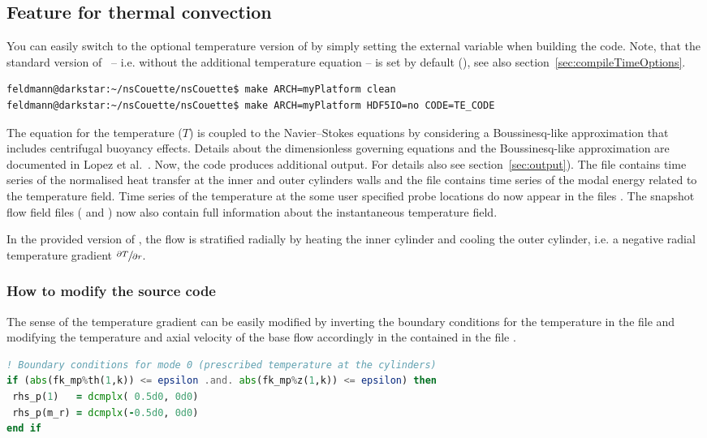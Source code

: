 \documentclass[a4paper, 11pt, DIV=11]{scrartcl}
\begin{document}
\subsection{Feature for thermal convection}
\label{sec:thermalConvection}

You can easily switch to the optional temperature version of \nsc by simply
setting the external variable  when building the code.
Note, that the standard version of \nsc~-- i.e. without the additional
temperature equation -- is set by default (), see also
section~\ref{sec:compileTimeOptions}.
\begin{lstlisting}[language=bash]
feldmann@darkstar:~/nsCouette/nsCouette$ make ARCH=myPlatform clean
feldmann@darkstar:~/nsCouette/nsCouette$ make ARCH=myPlatform HDF5IO=no CODE=TE_CODE
\end{lstlisting}
\par
The equation for the temperature ($T$) is coupled to the Navier--Stokes
equations by considering a Boussinesq-like approximation that includes
centrifugal buoyancy effects. Details about the dimensionless governing
equations and the Boussinesq-like approximation are documented in Lopez
et al.~\cite{Lopez2013}. Now, the code produces additional output. For
details also see section~\ref{sec:output}). The file 
contains time series of the normalised heat transfer at the inner and
outer cylinders walls and the file  contains time
series of the modal energy related to the temperature field. Time series
of the temperature at the some user specified probe locations do now
appear in the files . The snapshot flow field files
( and ) now also contain full information
about the instantaneous temperature field.
\par
In the provided version of \nsc, the flow is stratified radially by
heating the inner cylinder and cooling the outer cylinder, i.e. a
negative radial temperature gradient $\sfrac{\partial T}{\partial r}$.

\subsubsection{How to modify the source code}

The sense of the temperature gradient can be easily modified by inverting
the boundary conditions for the temperature in the file 
and modifying the temperature and axial velocity of the base flow accordingly
in the  contained in the file .
\begin{lstlisting}[language=Fortran]
! Boundary conditions for mode 0 (prescribed temperature at the cylinders)  
if (abs(fk_mp%th(1,k)) <= epsilon .and. abs(fk_mp%z(1,k)) <= epsilon) then  
 rhs_p(1)   = dcmplx( 0.5d0, 0d0) 
 rhs_p(m_r) = dcmplx(-0.5d0, 0d0) 
end if
\end{lstlisting}
\end{document}
